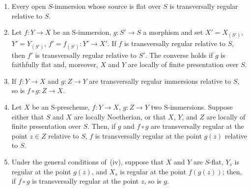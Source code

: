 \begin{proposition}[19.2.7]
\label{IV.19.2.7}
\medskip\noindent
\begin{enumerate}[label=(\roman*)]
  \item Every open $S$-immersion whose source is flat over $S$ is transversally regular relative to $S$.
  \item Let $f:Y\to X$ be an S-immersion, $g:S'\to S$ a morphism and set $X'=X_{(S')}$, $Y'=Y_{(S')}$, $f'=f_{(S')}:Y'\to X'$.
If $f$ is transversally regular relative to $S$, then $f'$ is transversally regular relative to $S'$. The converse holds if $g$ is faithfully flat and, moreover, $X$ and $Y$ are locally of finite presentation over $S$.
  \item If $f:Y\to X$ and $g:Z\to Y$ are transversally regular immersions relative to $S$, so is $f\circ g:Z\to X$.
  \item Let $X$ be an S-prescheme, $f:Y\to X$, $g:Z\to Y$ two S-immersions.
Suppose either that $S$ and $X$ are locally Noetherian, or that $X$, $Y$, and $Z$ are locally of finite presentation over $S$.
Then, if $g$ and $f\circ g$ are transversally regular at the point $z\in Z$ relative to $S$, $f$ is transversally regular at the point $g(z)$ relative to $S$.
  \item Under the general conditions of~(iv), suppose that $X$ and $Y$ are $S$-flat, $Y_s$ is regular at the point $g(z)$, and $X_s$ is regular at the point $f(g(z))$; then, if $f\circ g$ is transversally regular at the point $z$, so is $g$.
\end{enumerate}
\end{proposition}

